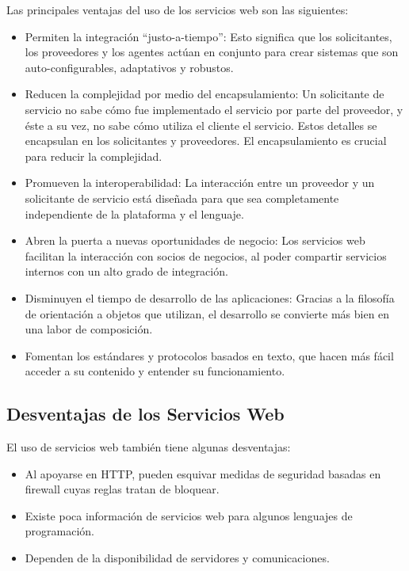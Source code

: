 	Las principales ventajas del uso de los servicios web son las siguientes:
\begin{itemize}
	\item Permiten la integración “justo-a-tiempo”:  Esto significa que los solicitantes, los proveedores y los agentes actúan en conjunto para crear sistemas que son auto-configurables, adaptativos y robustos.
	\item Reducen la complejidad por medio del encapsulamiento: Un solicitante de servicio no sabe cómo fue implementado el servicio por parte del proveedor, y éste a su vez, no sabe cómo utiliza el cliente el servicio. Estos detalles se encapsulan en los solicitantes y proveedores. El encapsulamiento es crucial para reducir la complejidad.
	\item Promueven la interoperabilidad: La interacción entre un proveedor y un solicitante de servicio está diseñada para que sea completamente independiente de la plataforma y el lenguaje. 
	\item Abren la puerta a nuevas oportunidades de negocio: Los servicios web facilitan la interacción con socios de negocios, al poder compartir servicios internos con un alto grado de integración.
	\item Disminuyen el tiempo de desarrollo de las aplicaciones: Gracias a la filosofía de orientación a objetos que utilizan, el desarrollo se convierte más bien en una labor de composición.
	\item Fomentan los estándares y protocolos basados en texto, que hacen más fácil acceder a su contenido y entender su funcionamiento.
\end{itemize}


\subsection{Desventajas de los  Servicios Web}
\label{cap:subsec:desventajasserviciosweb}
	El uso de servicios web también tiene algunas desventajas:
\begin{itemize}
	\item Al apoyarse en HTTP, pueden esquivar medidas de seguridad basadas en firewall cuyas reglas tratan de bloquear.
	\item Existe poca información de servicios web para algunos lenguajes de programación.
	\item Dependen de la disponibilidad de servidores y comunicaciones.
\end{itemize}




